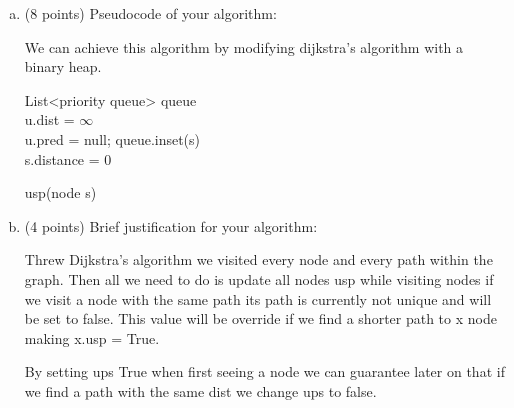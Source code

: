 \documentclass[12pt]{amsart}
\begin{document}
\begin{enumerate}[(a)]
\item (8 points)
Pseudocode of your algorithm:

We can achieve this algorithm by modifying dijkstra's algorithm with a binary heap. 

 \begin{algorithm}
\SetAlgoLined
List<priority queue>  queue\\
 {
    u.dist = $\infty$\\
    u.pred = null;
  }   
queue.inset(s)\\
s.distance = 0\\

 \caption{usp(node s)}
\end{algorithm}


\newpage

\item (4 points)
Brief justification for your algorithm:

Threw Dijkstra's algorithm we visited every node and every path within the graph. Then all we need to do is update all nodes usp while visiting nodes if we visit a node with the same path its path is currently not unique and will be set to false. This value will be override if we find a shorter path to x node making x.usp = True. 
 
By setting ups True when first seeing a node we can guarantee later on that if we find a path with the same dist we change ups to false. 
 

\end{enumerate}
\end{document}
